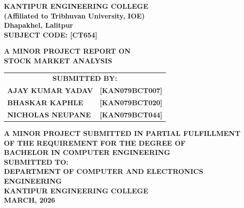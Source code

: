\documentclass[12pt, a4paper]{report}
\begin{document}
	\begin{titlepage}
		\centering
		
		{\Large \textbf{KANTIPUR ENGINEERING COLLEGE}}\\
		\textbf{(Affiliated to Tribhuvan University, IOE)}\\
		\textbf{Dhapakhel, Lalitpur}\\[0.4cm]
		
		{\large \textbf{SUBJECT CODE: [CT654]}}\\[0.8cm]
		\vspace{4 cm}
		
		{\LARGE \textbf{A MINOR PROJECT REPORT ON}}\\[0.8cm]
		
		{\LARGE \textbf{STOCK MARKET ANALYSIS}}\\
		
		\vspace{1cm}
		\begin{center}
			\begin{tabular}{lr}
				\multicolumn{2}{c}{\textbf{SUBMITTED BY:}} \\[0.5em]
				\textbf{\MakeUppercase{Ajay Kumar Yadav}} & \textbf{\MakeUppercase{[KAN079BCT007]}} \\
				\textbf{\MakeUppercase{Bhaskar Kaphle}} & \textbf{\MakeUppercase{[KAN079BCT020]}} \\
				\textbf{\MakeUppercase{Nicholas Neupane}} & \textbf{\MakeUppercase{[KAN079BCT044]}} \\
			\end{tabular}
		\end{center}
		\vspace{1cm}
		
		\textbf{\MakeUppercase{A MINOR PROJECT SUBMITTED IN PARTIAL FULFILLMENT OF THE REQUIREMENT FOR THE DEGREE OF}}\\
		\textbf{\MakeUppercase{BACHELOR IN COMPUTER ENGINEERING}}\\[0.5cm]
		
		\textbf{\MakeUppercase{SUBMITTED TO:}}\\
		\textbf{\MakeUppercase{Department of Computer and Electronics Engineering}}\\
		\textbf{\MakeUppercase{KANTIPUR ENGINEERING COLLEGE}}\\
		
		\vfill	
		\textbf{MARCH, 2026}
		
	\end{titlepage}
	
\end{document}
